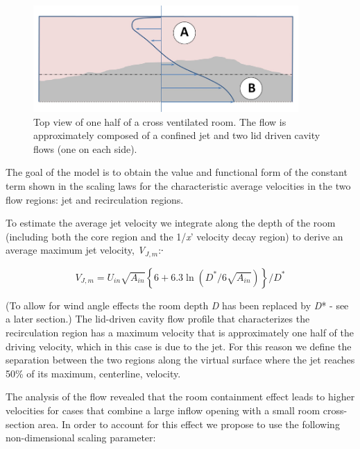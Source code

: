 \begin{figure}[hbtp] %
\centering
\includegraphics[width=0.9\textwidth, height=0.9\textheight, keepaspectratio=true]{media/image2624.png}
\caption{Top view of one half of a cross ventilated room. The flow is approximately composed of a confined jet and two lid driven cavity flows (one on each side). \protect \label{fig:top-view-of-one-half-of-a-cross-ventilated}}
\end{figure}

The goal of the model is to obtain the value and functional form of the constant term shown in the scaling laws for the characteristic average velocities in the two flow regions: jet and recirculation regions.

To estimate the average jet velocity we integrate along the depth of the room (including both the core region and the 1/\emph{x}' velocity decay region) to derive an average maximum jet velocity, \emph{V}\(_{J,m}\):∙

\begin{equation}
{V_{J,m}} = {U_{in}}\sqrt {{A_{in}}} \left\{ {6 + 6.3\ln \left( {{D^*}/6\sqrt {{A_{in}}} } \right)} \right\}/{D^*}
\end{equation}

(To allow for wind angle effects the room depth \emph{D} has been replaced by \emph{D}* - see a later section.) The lid-driven cavity flow profile that characterizes the recirculation region has a maximum velocity that is approximately one half of the driving velocity, which in this case is due to the jet. For this reason we define the separation between the two regions along the virtual surface where the jet reaches 50\% of its maximum, centerline, velocity.

The analysis of the flow revealed that the room containment effect leads to higher velocities for cases that combine a large inflow opening with a small room cross-section area. In order to account for this effect we propose to use the following non-dimensional scaling parameter:

